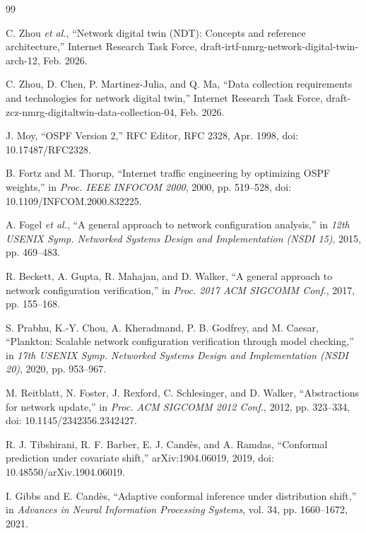 \begin{thebibliography}{99}

C. Zhou \emph{et al.}, ``Network digital twin (NDT): Concepts and reference architecture,'' Internet Research Task Force, draft-irtf-nmrg-network-digital-twin-arch-12, Feb. 2026.

C. Zhou, D. Chen, P. Martinez-Julia, and Q. Ma, ``Data collection requirements and technologies for network digital twin,'' Internet Research Task Force, draft-zcz-nmrg-digitaltwin-data-collection-04, Feb. 2026.

J. Moy, ``OSPF Version 2,'' RFC Editor, RFC 2328, Apr. 1998, doi: 10.17487/RFC2328.

B. Fortz and M. Thorup, ``Internet traffic engineering by optimizing OSPF weights,'' in \emph{Proc. IEEE INFOCOM 2000}, 2000, pp. 519--528, doi: 10.1109/INFCOM.2000.832225.

A. Fogel \emph{et al.}, ``A general approach to network configuration analysis,'' in \emph{12th USENIX Symp. Networked Systems Design and Implementation (NSDI 15)}, 2015, pp. 469--483.

R. Beckett, A. Gupta, R. Mahajan, and D. Walker, ``A general approach to network configuration verification,'' in \emph{Proc. 2017 ACM SIGCOMM Conf.}, 2017, pp. 155--168.

S. Prabhu, K.-Y. Chou, A. Kheradmand, P. B. Godfrey, and M. Caesar, ``Plankton: Scalable network configuration verification through model checking,'' in \emph{17th USENIX Symp. Networked Systems Design and Implementation (NSDI 20)}, 2020, pp. 953--967.

M. Reitblatt, N. Foster, J. Rexford, C. Schlesinger, and D. Walker, ``Abstractions for network update,'' in \emph{Proc. ACM SIGCOMM 2012 Conf.}, 2012, pp. 323--334, doi: 10.1145/2342356.2342427.

R. J. Tibshirani, R. F. Barber, E. J. Cand\`es, and A. Ramdas, ``Conformal prediction under covariate shift,'' arXiv:1904.06019, 2019, doi: 10.48550/arXiv.1904.06019.

I. Gibbs and E. Cand\`es, ``Adaptive conformal inference under distribution shift,'' in \emph{Advances in Neural Information Processing Systems}, vol. 34, pp. 1660--1672, 2021.


\end{thebibliography}
